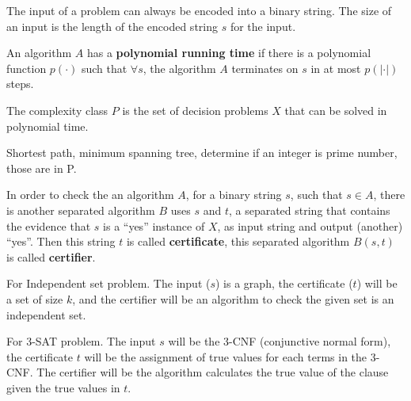 			The input of a problem can always be encoded into a binary string. The size of an input is the length of the encoded string $s$ for the input.


			\begin{definition}
				An algorithm $A$ has a \textbf{polynomial running time} if there is a polynomial function $p(\cdot)$ such that $\forall s$, the algorithm $A$ terminates on $s$ in at most $p(|\cdot|)$ steps.
			\end{definition}

			\begin{definition}[P]
				The complexity class $P$ is the set of decision problems $X$ that can be solved in polynomial time.
			\end{definition}

			\begin{example}
				Shortest path, minimum spanning tree, determine if an integer is prime number, those are in P.
			\end{example}

			\begin{definition}
				In order to check the an algorithm $A$, for a binary string $s$, such that $s \in A$, there is another separated algorithm $B$ uses $s$ and $t$, a separated string that contains the evidence that $s$ is a ``yes'' instance of $X$, as input string and output (another) ``yes''. Then this string $t$ is called \textbf{certificate}, this separated algorithm $B(s, t)$ is called \textbf{certifier}. 
			\end{definition}


			\begin{example}
				For Independent set problem. The input ($s$) is a graph, the certificate ($t$) will be a set of size $k$, and the certifier will be an algorithm to check the given set is an independent set.
			\end{example}

			\begin{example}
				For 3-SAT problem. The input $s$ will be the 3-CNF (conjunctive normal form), the certificate $t$ will be the assignment of true values for each terms in the 3-CNF. The certifier will be the algorithm calculates the true value of the clause given the true values in $t$.
			\end{example}

